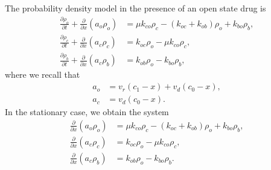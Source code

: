 The probability density model in the presence of an open state drug is
\begin{align}
\frac{\partial\rho_{o}}{\partial t}+\frac{\partial}{\partial x}\left(
a_{o}\rho_{o}\right)   &  =\mu k_{co}\rho_{c}-(k_{oc}+k_{ob})\rho_{o}+k_{bo}\rho_{b},\\
\frac{\partial\rho_{c}}{\partial t}+\frac{\partial}{\partial x}\left(
a_{c}\rho_{c}\right)   &  =k_{oc}\rho_{o}-\mu k_{co}\rho_{c},\\
\frac{\partial\rho_{b}}{\partial t}+\frac{\partial}{\partial x}\left(
a_{c}\rho_{b}\right)   &  =k_{ob}\rho_{o}-k_{bo}\rho_{b},
\end{align}
where we recall that 
\begin{align*}
a_{o} &  =v_{r}(c_{1}-x)+v_{d}(c_{0}-x),\\
a_{c} &  =v_{d}(c_{0}-x).
\end{align*}
In the stationary case, we obtain the system
\begin{align}
\frac{\partial}{\partial x}\left(
a_{o}\rho_{o}\right)   &  =\mu k_{co}\rho_{c}-(k_{oc}+k_{ob})\rho_{o}+k_{bo}\rho_{b},\\
\frac{\partial}{\partial x}\left(
a_{c}\rho_{c}\right)   &  =k_{oc}\rho_{o}-\mu k_{co}\rho_{c},\\
\frac{\partial}{\partial x}\left(
a_{c}\rho_{b}\right)   &  =k_{ob}\rho_{o}-k_{bo}\rho_{b}.
\end{align}
\begin{comment}
and in Figure \ref{1D:openblock_pdf} we show numerical solutions of this system using three values
of the control parameter $k_{bo}$.  For the closed state blocker we observed a monotonic improvement of the drug as the control parameter $k_{bc}$ increased. This is not the case for the open state blocker. The drug has effect for the mutant but not nearly as good effect as we observed for the closed state blocker. In Figure \ref{1D:openblock_pdf_zoom} we show the result for high concentrations using lower values of $k_{bo}$.

FIGURE: [fig/1D_openblock_pdf.pdf, width=500 frac=0.8] Open blocker using the characterization (\ref{kob}). Unlike the closed blocker case, the drug does not improve monotonically with increasing rates. label{1D:openblock_pdf}FIGURE: [fig/1D_openblock_pdf_zoom.pdf, width=500 frac=0.8] Results at high concentration for three different open state blockers. label{1D:openblock_pdf_zoom}We observed that the open state blockers computed based on the relation (\ref{kob}) does not give very good results. Another approach to this problem is to reconsider the system 
\begin{align}
\frac{\partial}{\partial x}\left(
a_{o}\rho_{o}\right)   &  =\mu k_{co}\rho_{c}-(k_{oc}+k_{ob})\rho_{o}+k_{bo}\rho_{b},\\
\frac{\partial}{\partial x}\left(
a_{c}\rho_{c}\right)   &  =k_{oc}\rho_{o}-\mu k_{co}\rho_{c},\\
\frac{\partial}{\partial x}\left(
a_{c}\rho_{b}\right)   &  =k_{ob}\rho_{o}-k_{bo}\rho_{b},
\end{align}
\end{comment}

